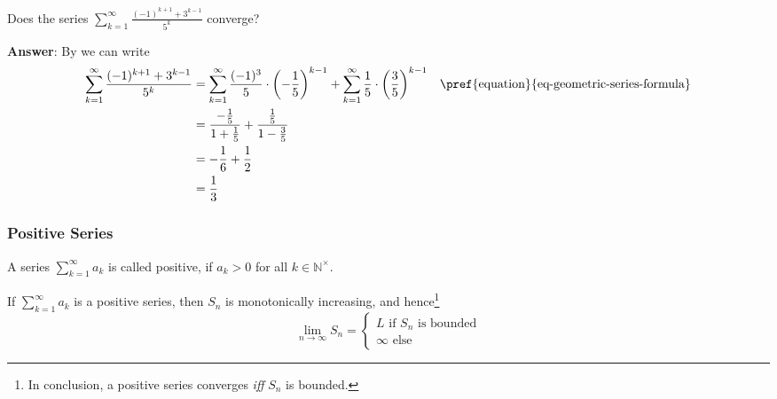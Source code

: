\begin{exm}\label{exm-sequence-series:8}
	Does the series $\sum_{k=1}^\infty \frac{(-1)^{k+1}+3^{k-1}}{5^k}$ converge?
	\begin{flushleft}
		\textbf{Answer}: By  we can write
		\begin{align*}
			\sum_{k=1}^\infty \frac{(-1)^{k+1}+3^{k-1}}{5^k}
			 & = \sum_{k=1}^\infty \frac{(-1)^3}{5}\cdot\left(-\frac{1}{5}\right)^{k-1} + \sum_{k=1}^\infty \frac{1}{5}\cdot\left(\frac{3}{5}\right)^{k-1} &  & \text{\pref{equation}{eq-geometric-series-formula}} \\
			 & = \frac{-\frac{1}{5}}{1+\frac{1}{5}} + \frac{\frac{1}{5}}{1-\frac{3}{5}}                                                                                                                             \\
			 & = -\frac{1}{6} + \frac{1}{2}                                                                                                                                                                         \\
			 & = \frac{1}{3}
		\end{align*}
	\end{flushleft}
\end{exm}

\subsubsection{Positive Series}\label{subsubsec-positive-series}

\begin{definition}\label{def-positive-series}
	A series $\sum_{k=1}^\infty a_k$ is called positive, if $a_k>0$ for all $k\in\mathbb{N}^\times$.
\end{definition}

\begin{thm}\label{thm-positive-series-bounded}
	If $\sum_{k=1}^\infty a_k$ is a positive series, then $S_n$ is monotonically increasing,
	and hence\footnote{In conclusion, a positive series converges \textit{iff} $S_n$ is bounded.}
	\begin{equation}
		\lim_{n\to\infty} S_n = \begin{cases}
			L \text{ if } S_n \text{ is bounded} \\
			\infty \text{ else }
		\end{cases}
	\end{equation}
\end{thm}

